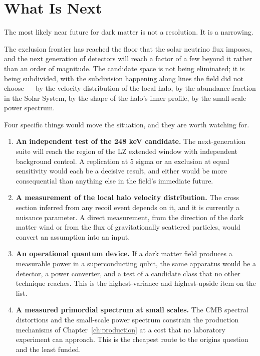 
\backmatter

\chapter*{What Is Next}
\thispagestyle{plain}

The most likely near future for dark matter is not a resolution. It is a
narrowing.

The exclusion frontier has reached the floor that the solar neutrino flux
imposes, and the next generation of detectors will reach a factor of a few
beyond it rather than an order of magnitude. The candidate space is not
being eliminated; it is being subdivided, with the subdivision happening
along lines the field did not choose --- by the velocity distribution of the
local halo, by the abundance fraction in the Solar System, by the shape of
the halo's inner profile, by the small-scale power spectrum.

Four specific things would move the situation, and they are worth watching
for.

\begin{enumerate}
\item \textbf{An independent test of the 248 keV candidate.} The
next-generation suite will reach the region of the LZ extended window with
independent background control. A replication at 5 sigma or an exclusion at
equal sensitivity would each be a decisive result, and either would be more
consequential than anything else in the field's immediate future.

\item \textbf{A measurement of the local halo velocity distribution.} The
cross section inferred from any recoil event depends on it, and it is
currently a nuisance parameter. A direct measurement, from the direction of
the dark matter wind or from the flux of gravitationally scattered particles,
would convert an assumption into an input.

\item \textbf{An operational quantum device.} If a dark matter field
produces a measurable power in a superconducting qubit, the same apparatus
would be a detector, a power converter, and a test of a candidate class that
no other technique reaches. This is the highest-variance and highest-upside
item on the list.

\item \textbf{A measured primordial spectrum at small scales.} The CMB
spectral distortions and the small-scale power spectrum constrain the
production mechanisms of Chapter~\ref{ch:production} at a cost that no
laboratory experiment can approach. This is the cheapest route to the
origins question and the least funded.
\end{enumerate}

